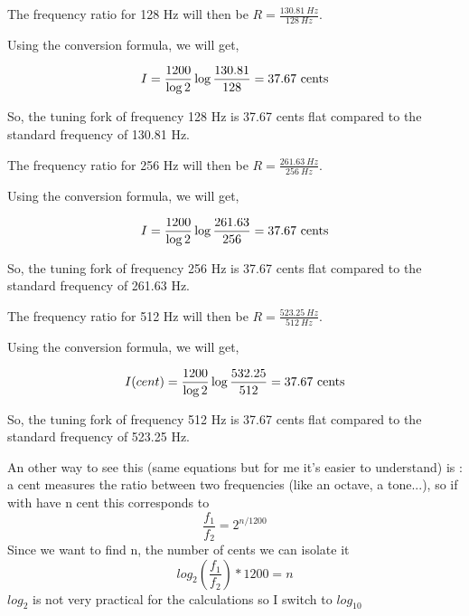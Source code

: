 \documentclass{article}
\begin{document}
The frequency ratio for 128 Hz will then be $R=\frac{130.81 \ Hz}{128 \ Hz}$.

Using the conversion formula, we will get,

\begin{equation}
    I = \frac{1200}{\log{2}} \log{\frac{130.81}{128}} = 37.67 \ {\rm cents} 
\end{equation}

So, the tuning fork of frequency 128 Hz is 37.67 cents flat compared to the standard frequency of 130.81 Hz.

The frequency ratio for 256 Hz will then be $R=\frac{261.63 \ Hz}{256 \ Hz}$.

Using the conversion formula, we will get,

\begin{equation}
    I = \frac{1200}{\log{2}} \log{\frac{261.63}{256}} = 37.67 \ {\rm cents} 
\end{equation}

So, the tuning fork of frequency 256 Hz is 37.67 cents flat compared to the standard frequency of 261.63 Hz.

The frequency ratio for 512 Hz will then be $R=\frac{523.25 \ Hz}{512 \ Hz}$.

Using the conversion formula, we will get,

\begin{equation}
    I(cent) = 
    \frac{1200}{\log{2}} \log{\frac{532.25}{512}} = 37.67 \ {\rm cents} 
\end{equation}

So, the tuning fork of frequency 512 Hz is 37.67 cents flat compared to the standard frequency of 523.25 Hz.

An other way to see this (same equations but for me it's easier to understand) is :
a cent measures the ratio between two frequencies (like an octave, a tone...), so if with have n cent this corresponds to 
\begin{equation}
    \frac{f_1}{f_2} = 2^{n/1200}
\end{equation}
Since we want to find n, the number of cents we can isolate it
\begin{equation}
   log_2( \frac{f_1}{f_2})*1200 = n
\end{equation}
$log_2$ is not very practical for the calculations so I switch to $log_{10}$
\end{document}
